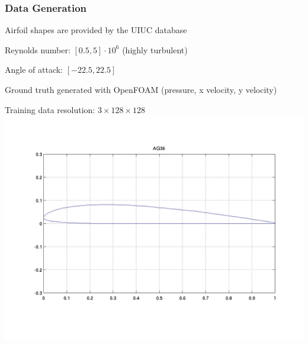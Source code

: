 
\begin{frame}
    \frametitle{Data Generation}

\vspace*{1cm}
\begin{multicols}{2}
    Airfoil shapes are provided by the UIUC database

    Reynolds number: $[0.5, 5] \cdot 10^6$ (highly turbulent)

    Angle of attack: $[-22.5, 22.5]$

    Ground truth generated with OpenFOAM \newline (pressure, x velocity, y velocity)
    
    Training data resolution: $3\times 128 \times 128$
    \vfill\columnbreak
    \includegraphics[width=\columnwidth, height=.6\textheight]{./Ressourcen/Praesentation/Bilder/uiuc_sample.png}%
\end{multicols}
    
\end{frame}
\clearpage
